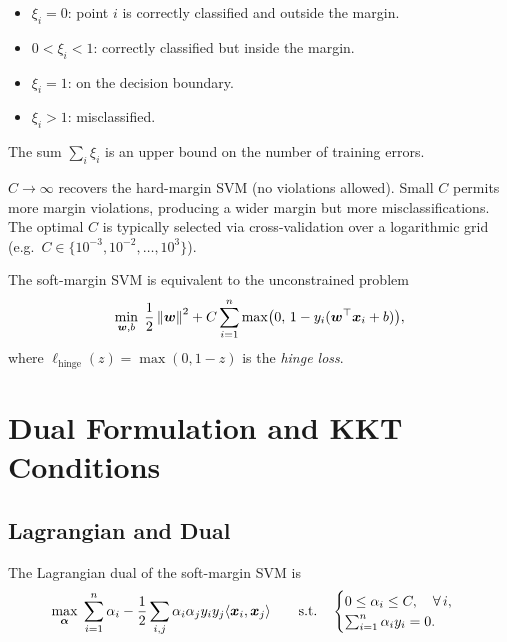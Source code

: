 \begin{proposition}[Interpretation of $\xi_i$]
\begin{itemize}
    \item $\xi_i = 0$: point $i$ is correctly classified and outside the margin.
    \item $0 < \xi_i < 1$: correctly classified but inside the margin.
    \item $\xi_i = 1$: on the decision boundary.
    \item $\xi_i > 1$: misclassified.
\end{itemize}
The sum $\sum_i \xi_i$ is an upper bound on the number of training errors.
\end{proposition}

\begin{warning}[title=\textbf{Role of $C$}]
$C \to \infty$ recovers the hard-margin SVM (no violations allowed). Small $C$ permits more margin violations, producing a wider margin but more misclassifications. The optimal $C$ is typically selected via cross-validation over a logarithmic grid (e.g.\ $C \in \{10^{-3}, 10^{-2}, \ldots, 10^{3}\}$).
\end{warning}

\begin{proposition}
The soft-margin SVM is equivalent to the unconstrained problem
\[
    \min_{\bm{w},b}\;\frac{1}{2}\left\| \bm{w} \right\|^2 + C\sum_{i=1}^{n}\max\bigl(0,\, 1-y_i(\bm{w}^\top\bm{x}_i+b)\bigr),
\]
where $\ell_{\text{hinge}}(z) = \max(0, 1-z)$ is the \emph{hinge loss}.
\end{proposition}

\section{Dual Formulation and KKT Conditions}

\subsection{Lagrangian and Dual}

\begin{theorem}\label{thm:svm-dual}
The Lagrangian dual of the soft-margin SVM is
\[
    \max_{\bm{\alpha}}\; \sum_{i=1}^{n}\alpha_i - \frac{1}{2}\sum_{i,j}\alpha_i\alpha_j y_i y_j \langle \bm{x}_i, \bm{x}_j \rangle
    \qquad \text{s.t.}\quad
    \begin{cases}
        0 \leq \alpha_i \leq C, \quad \forall\, i, \\
        \sum_{i=1}^{n}\alpha_i y_i = 0.
    \end{cases}
\]
\end{theorem}

